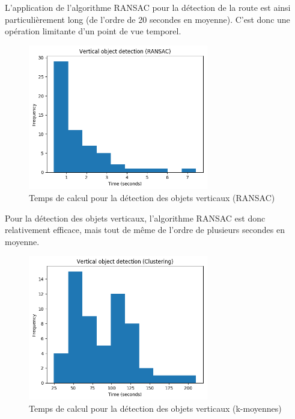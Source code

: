 \documentclass[titlepage,11pt,a4paper]{article}
\begin{document}
\par L'application de l'algorithme RANSAC pour la détection de la route est ainsi particulièrement long (de l'ordre de 20 secondes en moyenne). C'est donc une opération limitante d'un point de vue temporel.


\begin{figure}[H]
  \centering
    \includegraphics[width=0.7\textwidth]{images/Vertical_object_detection_(RANSAC).png}
  \caption{Temps de calcul pour la détection des objets verticaux (RANSAC)}
\end{figure}

\par Pour la détection des objets verticaux, l'algorithme RANSAC est donc relativement efficace, mais tout de même de l'ordre de plusieurs secondes en moyenne. 

\begin{figure}[H]
  \centering
    \includegraphics[width=0.7\textwidth]{images/Vertical_object_detection_(Clustering).png}
  \caption{Temps de calcul pour la détection des objets verticaux (k-moyennes)}
\end{figure}
\end{document}
